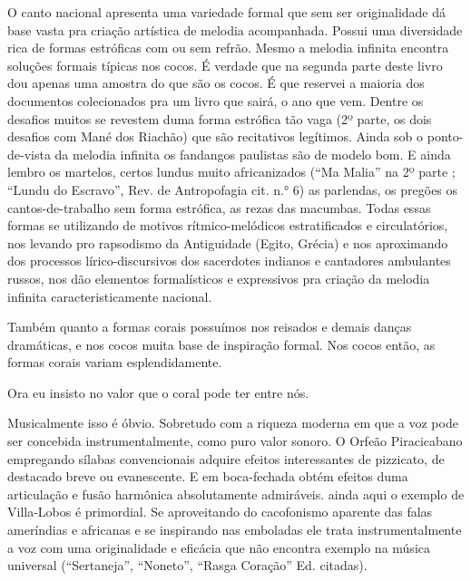 O canto nacional apresenta uma variedade formal que sem ser
originalidade dá base vasta pra criação artística de melodia
acompanhada. Possui uma diversidade rica de formas estróficas com ou sem
refrão. Mesmo a melodia infinita encontra soluções formais típicas nos
cocos. É verdade que na segunda parte deste livro dou apenas uma amostra
do que são os cocos. É que reservei a maioria dos documentos
colecionados pra um livro que sairá, o ano que vem. Dentre os desafios
muitos se revestem duma forma estrófica tão vaga (2º parte, os dois
desafios com Mané dos Riachão) que são recitativos legítimos. Ainda sob
o ponto-de-vista da melodia infinita os fandangos paulistas são de
modelo bom. E ainda lembro os martelos, certos lundus muito
africanizados (``Ma Malia'' na 2º parte ; ``Lundu do Escravo'', Rev. de
Antropofagia cit. n.° 6) as parlendas, os pregões os cantos-de-trabalho
sem forma estrófica, as rezas das macumbas. Todas essas formas se
utilizando de motivos rítmico-melódicos estratificados e circulatórios,
nos levando pro rapsodismo da Antiguidade (Egito, Grécia) e nos
aproximando dos processos lírico-discursivos dos sacerdotes indianos e
cantadores ambulantes russos, nos dão elementos formalísticos e
expressivos pra criação da melodia infinita caracteristicamente
nacional.

Também quanto a formas corais possuímos nos reisados e demais danças
dramáticas, e nos cocos muita base de inspiração formal. Nos cocos
então, as formas corais variam esplendidamente.

Ora eu insisto no valor que o coral pode ter entre nós.

Musicalmente isso é óbvio. Sobretudo com a riqueza moderna em que a voz
pode ser concebida instrumentalmente, como puro valor sonoro. O Orfeão
Piracicabano empregando sílabas convencionais adquire efeitos
interessantes de pizzicato, de destacado breve ou evanescente. E em
boca-fechada obtém efeitos duma articulação e fusão harmônica
absolutamente admiráveis. ainda aqui o exemplo de Villa-Lobos é
primordial. Se aproveitando do cacofonismo aparente das falas ameríndias
e africanas e se inspirando nas emboladas ele trata instrumentalmente a
voz com uma originalidade e eficácia que não encontra exemplo na música
universal (``Sertaneja'', ``Noneto'', ``Rasga Coração'' Ed. citadas).

